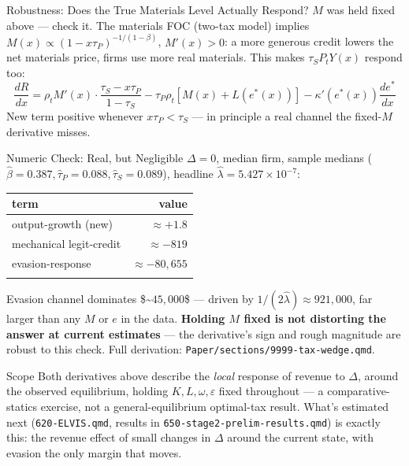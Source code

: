\documentclass[
  ignorenonframetext,
  aspectratio=169,
]{beamer}
\newcounter{none} %
\begin{document}
\begin{frame}{Robustness: Does the True Materials Level Actually
Respond?}
\protect{}\label{robustness-does-the-true-materials-level-actually-respond}
\(M\) was held fixed above --- check it. The materials FOC (two-tax
model) implies \(M(x)\propto(1-x\tau_P)^{-1/(1-\beta)}\), \(M'(x)>0\): a
more generous credit lowers the net materials price, firms use more real
materials. This makes \(\tau_SP_tY(x)\) respond too: \[
\frac{dR}{dx} = \rho_tM'(x)\cdot\frac{\tau_S-x\tau_P}{1-\tau_S} - \tau_P\rho_t[M(x)+L(e^*(x))] - \kappa'(e^*(x))\frac{de^*}{dx}
\] New term positive whenever \(x\tau_P<\tau_S\) --- in principle a real
channel the fixed-\(M\) derivative misses.
\end{frame}

\begin{frame}[fragile]{Numeric Check: Real, but Negligible}
\protect{}\label{numeric-check-real-but-negligible}
\(\Delta=0\), median firm, sample medians
(\(\hat\beta=0.387,\hat\tau_P=0.088,\hat\tau_S=0.089\)), headline
\(\hat\lambda=5.427\times10^{-7}\):

{\def\LTcaptype{none} %
\begin{longtable}[]{@{}lr@{}}
\toprule\noalign{}
term & value \\
\midrule\noalign{}
\endhead
output-growth (new) & \(\approx+1.8\) \\
mechanical legit-credit & \(\approx-819\) \\
evasion-response & \(\approx-80{,}655\) \\
\bottomrule\noalign{}
\end{longtable}
}

Evasion channel dominates \$\sim\(45,000\)\times\$ --- driven by
\(1/(2\hat\lambda)\approx921{,}000\), far larger than any \(M\) or \(e\)
in the data. \textbf{Holding \(M\) fixed is not distorting the answer at
current estimates} --- the derivative's sign and rough magnitude are
robust to this check. Full derivation:
\texttt{Paper/sections/9999-tax-wedge.qmd}.
\end{frame}

\begin{frame}[fragile]{Scope}
\protect{}\label{scope}
Both derivatives above describe the \emph{local} response of revenue to
\(\Delta\), around the observed equilibrium, holding
\(K,L,\omega,\varepsilon\) fixed throughout --- a comparative-statics
exercise, not a general-equilibrium optimal-tax result. What's estimated
next (\texttt{620-ELVIS.qmd}, results in
\texttt{650-stage2-prelim-results.qmd}) is exactly this: the revenue
effect of small changes in \(\Delta\) around the current state, with
evasion the only margin that moves.
\end{frame}
\end{document}
